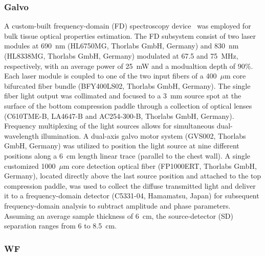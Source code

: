 \subsubsection{Galvo}
\label{sec:RF}
A custom-built frequency-domain (FD) spectroscopy device~\cite{Zimmermann2016} was employed for bulk tissue optical properties estimation. The FD subsystem consist of two laser modules at 690~nm (HL6750MG, Thorlabs GmbH, Germany) and 830~nm (HL8338MG, Thorlabs GmbH, Germany) modulated at 67.5 and 75~MHz, respectively, with an average power of 25~mW and a modualtion depth of 90\%. Each laser module is coupled to one of the two input fibers of a 400~$\mu$m core bifurcated fiber bundle (BFY400LS02, Thorlabs GmbH, Germany). The single fiber light output was collimated and focused to a 3~mm source spot at the surface of the bottom compression paddle through a collection of optical lenses (C610TME-B, LA4647-B and AC254-300-B, Thorlabs GmbH, Germany). Frequency multiplexing of the light sources allows for simultaneous dual-wavelength illumination. A dual-axis galvo motor system (GVS002, Thorlabs GmbH, Germany) was utilized to position the light source at nine different positions along a 6~cm length linear trace (parallel to the chest wall). A single customized 1000~$\mu$m core detection optical fiber (FP1000ERT, Thorlabs GmbH, Germany), located directly above the last source position and attached to the top compression paddle, was used to collect the diffuse transmitted light and deliver it to a frequency-domain detector (C5331-04, Hamamatsu, Japan) for subsequent frequency-domain analysis to subtract amplitude and phase parameters. Assuming an average sample thickness of 6~cm, the source-detector (SD) separation ranges from 6 to 8.5~cm.


\subsubsection{WF}

